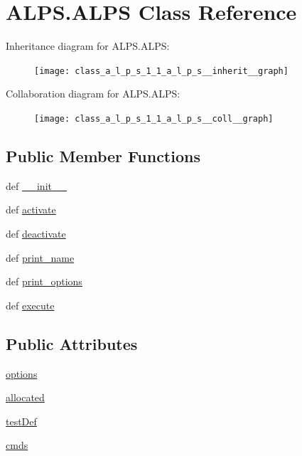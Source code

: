 \hypertarget{class_a_l_p_s_1_1_a_l_p_s}{\section{A\-L\-P\-S.\-A\-L\-P\-S Class Reference}
\label{class_a_l_p_s_1_1_a_l_p_s}
}


Inheritance diagram for A\-L\-P\-S.\-A\-L\-P\-S\-:
\nopagebreak
\begin{figure}[H]
\begin{center}
\leavevmode
\texttt{[image: class\_a\_l\_p\_s\_1\_1\_a\_l\_p\_s\_\_inherit\_\_graph]}
\end{center}
\end{figure}


Collaboration diagram for A\-L\-P\-S.\-A\-L\-P\-S\-:
\nopagebreak
\begin{figure}[H]
\begin{center}
\leavevmode
\texttt{[image: class\_a\_l\_p\_s\_1\_1\_a\_l\_p\_s\_\_coll\_\_graph]}
\end{center}
\end{figure}
\subsection*{Public Member Functions}
\begin{DoxyCompactItemize}
\item 
def \hyperlink{class_a_l_p_s_1_1_a_l_p_s_a45417f6290435c66b3f3b7c4586915d9}{\-\_\-\-\_\-init\-\_\-\-\_\-}
\item 
def \hyperlink{class_a_l_p_s_1_1_a_l_p_s_a3d507bd3feb505c8ed1b4e8f3729d636}{activate}
\item 
def \hyperlink{class_a_l_p_s_1_1_a_l_p_s_aa1d63291a23bcca8ccbd44dc4d0fa6bf}{deactivate}
\item 
def \hyperlink{class_a_l_p_s_1_1_a_l_p_s_a97e56ee7f5faaea26121d6ee0deeddab}{print\-\_\-name}
\item 
def \hyperlink{class_a_l_p_s_1_1_a_l_p_s_a68c17d876ad850e44d40aa082b674f4e}{print\-\_\-options}
\item 
def \hyperlink{class_a_l_p_s_1_1_a_l_p_s_af4b8efc64ea3abc5fb21fb93bfe052ff}{execute}
\end{DoxyCompactItemize}
\subsection*{Public Attributes}
\begin{DoxyCompactItemize}
\item 
\hyperlink{class_a_l_p_s_1_1_a_l_p_s_a24dfa9b508f507c4cb6148f10a081555}{options}
\item 
\hyperlink{class_a_l_p_s_1_1_a_l_p_s_ac371dce53e8c120f7031259025562bdb}{allocated}
\item 
\hyperlink{class_a_l_p_s_1_1_a_l_p_s_a839c4f84a46683221d51004c08345ff2}{test\-Def}
\item 
\hyperlink{class_a_l_p_s_1_1_a_l_p_s_a64bae95ba692ef4df06f716692b50ee9}{cmds}
\end{DoxyCompactItemize}


